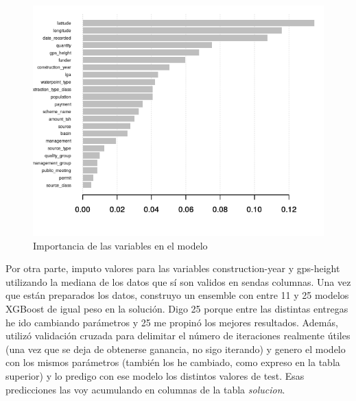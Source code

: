\begin{figure}[H] %
	\centering
	\includegraphics[scale=0.5]{importancia-variables.png}  %
	\caption{Importancia de las variables en el modelo} 
	\label{fig:importancia}
\end{figure}

Por otra parte, imputo valores para las variables construction-year y gps-height utilizando la mediana de los datos que sí son validos en sendas columnas. Una vez que están preparados los datos, construyo un ensemble con entre 11 y 25 modelos XGBoost de igual peso en la solución. Digo 25 porque entre las distintas entregas he ido cambiando parámetros y 25 me propinó los mejores resultados. Además, utilizó validación cruzada para delimitar el número de iteraciones realmente útiles (una vez que se deja de obtenerse ganancia, no sigo iterando) y genero el modelo con los mismos parámetros (también los he cambiado, como expreso en la tabla superior) y lo predigo con ese modelo los distintos valores de test. Esas predicciones las voy acumulando en columnas de la tabla \textit{solucion}.

